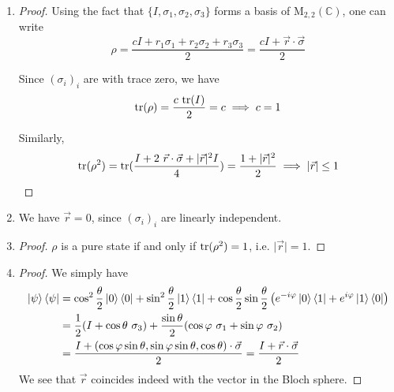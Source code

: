 \documentclass[../main.tex]{subfiles}
\begin{document}
\bigskip
\begin{exercise}
\end{exercise}
\begin{enumerate}
    \item
    \begin{proof}
        Using the fact that $\{I,\sigma_1,\sigma_2,\sigma_3\}$ forms a basis of $\mathrm{M}_{2,2}(\mathbb{C})$, one can write
        \begin{equation*}
            \rho = \frac{c I + r_1 \sigma_1 + r_2 \sigma_2 + r_3 \sigma_3}{2}=\frac{c I + \vec{r}\cdot\vec{\sigma}}{2}
        \end{equation*}
        
        Since $(\sigma_i)_i$ are with trace zero, we have
        \begin{equation*}
            \mathrm{tr}(\rho)=\frac{c\ \mathrm{tr}(I)}{2}=c \implies c=1
        \end{equation*}
        
        Similarly,
        \begin{equation*}
            \tr(\rho^2)=\tr(\frac{I+2\ \vec{r}\cdot\vec{\sigma}+\lvert \vec{r}\rvert^2 I}{4})=\frac{1+\lvert \vec{r}\rvert^2}{2} \implies \lvert \vec{r}\rvert\leq 1
        \end{equation*}
    \end{proof}
    
    \item
    We have $\vec{r}=0$, since $(\sigma_i)_i$ are linearly independent.
    
    \item
    \begin{proof}
        $\rho$ is a pure state if and only if $\mathrm{tr}(\rho^2)=1$, i.e. $\lvert\vec{r}\rvert=1$.
    \end{proof}
    
    \item
    \begin{proof}
        We simply have
        \begin{align*}
            \ket{\psi}\bra{\psi}
            &= \cos^2\frac{\theta}{2}\ket{0}\bra{0}+\sin^2\frac{\theta}{2}\ket{1}\bra{1}+\cos\frac{\theta}{2}\sin\frac{\theta}{2}\left(e^{-i\varphi}\ket{0}\bra{1}+e^{i\varphi}\ket{1}\bra{0}\right) \\
            &= \frac{1}{2}(I+\cos\theta \ \sigma_3)+\frac{\sin\theta}{2}(\cos\varphi\ \sigma_1+\sin\varphi\ \sigma_2) \\
            &= \frac{I+(\cos\varphi\sin\theta, \sin\varphi\sin\theta, \cos\theta)\cdot\vec{\sigma}}{2} = \frac{I+\vec{r}\cdot\vec{\sigma}}{2}
        \end{align*}
        We see that $\vec{r}$ coincides indeed with the vector in the Bloch sphere.
    \end{proof}
\end{enumerate}
\end{document}
